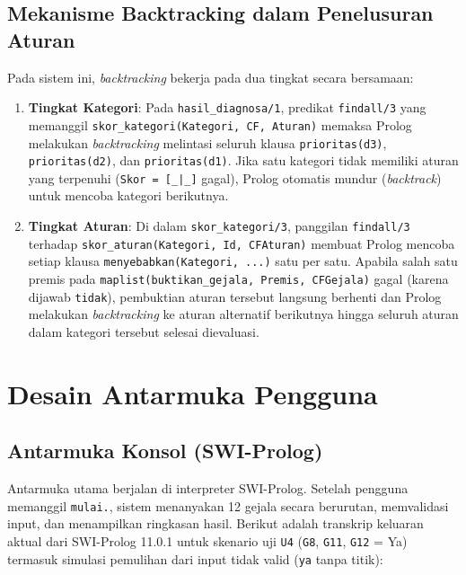 \documentclass[12pt,a4paper]{report}
\begin{document}
\subsection{Mekanisme Backtracking dalam Penelusuran Aturan}
Pada sistem ini, \textit{backtracking} bekerja pada dua tingkat secara bersamaan:
\begin{enumerate}
  \item \textbf{Tingkat Kategori}: Pada \texttt{hasil\_diagnosa/1}, predikat \texttt{findall/3} yang memanggil \texttt{skor\_kategori(Kategori, CF, Aturan)} memaksa Prolog melakukan \textit{backtracking} melintasi seluruh klausa \texttt{prioritas(d3)}, \texttt{prioritas(d2)}, dan \texttt{prioritas(d1)}. Jika satu kategori tidak memiliki aturan yang terpenuhi (\texttt{Skor = [\_|\_]} gagal), Prolog otomatis mundur (\textit{backtrack}) untuk mencoba kategori berikutnya.
  \item \textbf{Tingkat Aturan}: Di dalam \texttt{skor\_kategori/3}, panggilan \texttt{findall/3} terhadap \texttt{skor\_aturan(Kategori, Id, CFAturan)} membuat Prolog mencoba setiap klausa \texttt{menyebabkan(Kategori, ...)} satu per satu. Apabila salah satu premis pada \texttt{maplist(buktikan\_gejala, Premis, CFGejala)} gagal (karena dijawab \texttt{tidak}), pembuktian aturan tersebut langsung berhenti dan Prolog melakukan \textit{backtracking} ke aturan alternatif berikutnya hingga seluruh aturan dalam kategori tersebut selesai dievaluasi.
\end{enumerate}

\section{Desain Antarmuka Pengguna}

\subsection{Antarmuka Konsol (SWI-Prolog)}
Antarmuka utama berjalan di interpreter SWI-Prolog. Setelah pengguna memanggil \texttt{mulai.}, sistem menanyakan 12 gejala secara berurutan, memvalidasi input, dan menampilkan ringkasan hasil. Berikut adalah transkrip keluaran aktual dari SWI-Prolog 11.0.1 untuk skenario uji \texttt{U4} (\texttt{G8}, \texttt{G11}, \texttt{G12} = Ya) termasuk simulasi pemulihan dari input tidak valid (\texttt{ya} tanpa titik):
\end{document}
